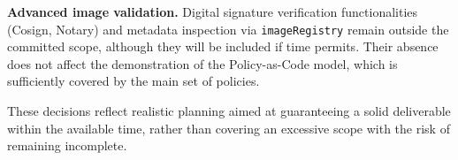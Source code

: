 \textbf{Advanced image validation.} Digital signature verification functionalities (Cosign, Notary) and metadata inspection via \texttt{imageRegistry} remain outside the committed scope, although they will be included if time permits. Their absence does not affect the demonstration of the Policy-as-Code model, which is sufficiently covered by the main set of policies.

These decisions reflect realistic planning aimed at guaranteeing a solid deliverable within the available time, rather than covering an excessive scope with the risk of remaining incomplete.
